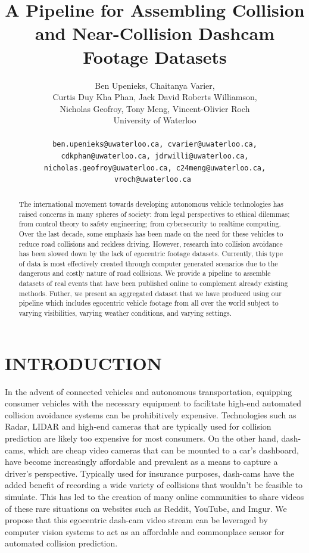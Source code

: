 \documentclass[letterpaper, 10 pt, conference]{IEEEconf}
\title{\LARGE \bf
A Pipeline for Assembling Collision and Near-Collision Dashcam Footage Datasets
}
\author{
         Ben Upenieks, Chaitanya Varier,\\
         Curtis Duy Kha Phan, Jack David Roberts Williamson,\\
         Nicholas Geofroy, Tony Meng, Vincent-Olivier Roch\\
         University of Waterloo\\
         \\
         \tt\small ben.upenieks@uwaterloo.ca, cvarier@uwaterloo.ca,
         \\ \tt\small cdkphan@uwaterloo.ca, jdrwilli@uwaterloo.ca,
         \\ \tt\small nicholas.geofroy@uwaterloo.ca, c24meng@uwaterloo.ca, vroch@uwaterloo.ca
}
\begin{document}
\maketitle
\thispagestyle{empty}
\pagestyle{empty}


\begin{abstract}

The international movement towards developing autonomous vehicle technologies has raised concerns in many spheres of society: from legal perspectives \cite{Pattinson2020} to ethical dilemmas; from control theory to safety engineering; from cybersecurity to realtime computing. Over the
last decade, some emphasis has been made on the need for these vehicles to reduce road collisions and reckless driving. However, research into collision avoidance has been slowed down by the lack of egocentric footage datasets. Currently, this type of data is most effectively created through computer generated scenarios due to the dangerous and costly nature of road collisions. We provide a pipeline to assemble datasets of real events that have been published online to complement already existing methods. Futher, we present an aggregated dataset that we have produced using our pipeline which includes egocentric vehicle footage from all over the world subject to varying visibilities, varying weather conditions, and varying settings.

\end{abstract}

\section{INTRODUCTION}

In the advent of connected vehicles and autonomous transportation, equipping consumer vehicles with the necessary equipment to facilitate high-end automated collision avoidance systems can be prohibitively expensive.
Technologies such as Radar, LIDAR and high-end cameras that are typically used for collision prediction are likely too expensive for most consumers.
On the other hand, dash-cams, which are cheap video cameras that can be mounted to a car's dashboard, have become increasingly affordable and prevalent as a means to capture a driver’s perspective.
Typically used for insurance purposes, dash-cams have the added benefit of recording a wide variety of collisions that wouldn't be feasible to simulate. 
This has led to the creation of many online communities to share videos of these rare situations on websites such as Reddit, YouTube, and Imgur.
We propose that this egocentric dash-cam video stream can be leveraged by computer vision systems to act as an affordable and commonplace sensor for automated collision prediction. 
\end{document}
